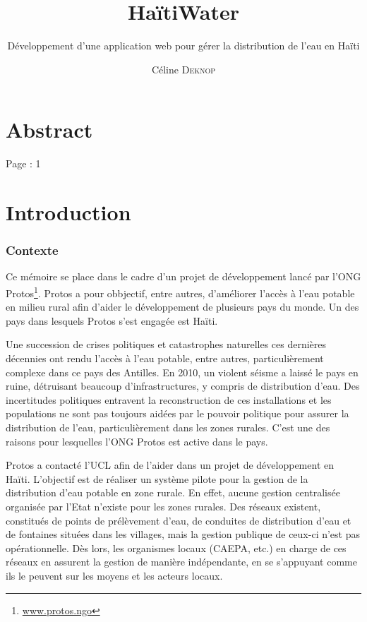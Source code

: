 \documentclass{eplmastersthesis_FR}
\title{HaïtiWater}
\subtitle{Développement d'une application web pour gérer la distribution de l'eau en Haïti}
\author{Céline \textsc{Deknop}}
\begin{document}
	\frontpage
	\tableofcontents

	\setlength{\parskip}{1.5em plus1em minus1em}


	\chapter*{Abstract}

		Page : 1

	\chapter{Introduction}



		\subsection*{Contexte}

			Ce mémoire se place dans le cadre d'un projet de développement lancé par l'ONG Protos\footnote{\href{https://www.protos.ngo/fr/}{www.protos.ngo}}. Protos a pour obbjectif, entre autres, d'améliorer l'accès à l'eau potable en milieu rural afin d'aider le développement de plusieurs pays du monde. Un des pays dans lesquels Protos s'est engagée est Haïti.

			Une succession de crises politiques et catastrophes naturelles ces dernières décennies ont rendu l'accès à l'eau potable, entre autres, particulièrement complexe dans ce pays des Antilles. En 2010, un violent séisme a laissé le pays en ruine, détruisant beaucoup d'infrastructures, y compris de distribution d'eau. Des incertitudes politiques entravent la reconstruction de ces installations et les populations ne sont pas toujours aidées par le pouvoir politique pour assurer la distribution de l'eau, particulièrement dans les zones rurales. C'est une des raisons pour lesquelles l'ONG Protos est active dans le pays.

			Protos a contacté l'UCL afin de l'aider dans un projet de développement en Haïti. L'objectif est de réaliser un système pilote pour la gestion de la distribution d'eau potable en zone rurale. En effet, aucune gestion centralisée organisée par l'Etat n'existe pour les zones rurales. Des réseaux existent, constitués de points de prélèvement d'eau, de conduites de distribution d'eau et de fontaines situées dans les villages, mais la gestion publique de ceux-ci n'est pas opérationnelle. Dès lors, les organismes locaux (CAEPA, etc.) en charge de ces réseaux en assurent la gestion de manière indépendante, en se s'appuyant comme ils le peuvent sur les moyens et les acteurs locaux.
\end{document}
